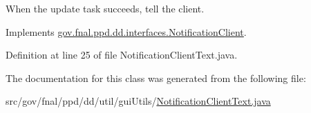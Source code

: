 When the update task succeeds, tell the client. 



Implements \hyperlink{interfacegov_1_1fnal_1_1ppd_1_1dd_1_1interfaces_1_1NotificationClient_a6aa9aea7f841d3b3af77302d32aa2197}{gov.\-fnal.\-ppd.\-dd.\-interfaces.\-Notification\-Client}.



Definition at line 25 of file Notification\-Client\-Text.\-java.



The documentation for this class was generated from the following file\-:\begin{DoxyCompactItemize}
\item 
src/gov/fnal/ppd/dd/util/gui\-Utils/\hyperlink{NotificationClientText_8java}{Notification\-Client\-Text.\-java}\end{DoxyCompactItemize}
